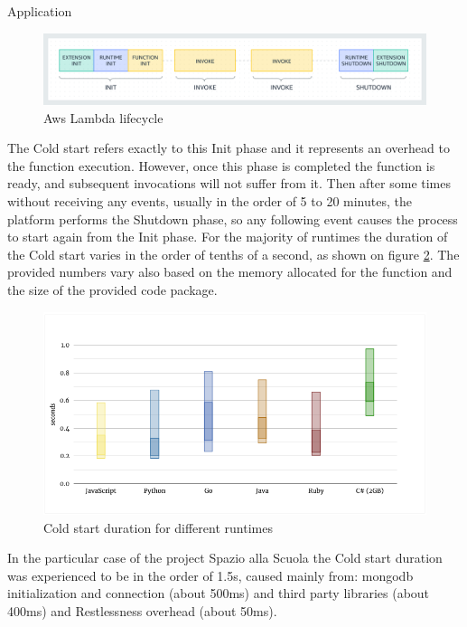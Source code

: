 \begin{chapter}{Application}
    \begin{figure}
        \centering
        \includegraphics[width=\linewidth]{source/images/aws-lambda-lifecycle.png}
        \caption{Aws Lambda lifecycle}
        \label{fig:aws_lambda_lifecycle}
    \end{figure}

    The Cold start refers exactly to this Init phase and it represents an overhead to the
    function execution. However, once this phase is completed the function is ready,
    and subsequent invocations will not suffer from it. Then after some times without
    receiving any events, usually in the order of 5 to 20 minutes, the platform performs
    the Shutdown phase, so any following event causes the process to start again from
    the Init phase.
    For the majority of runtimes the duration of the Cold start varies in the order
    of tenths of a second, as shown on figure \ref{fig:cold_start_duration}. The provided
    numbers vary also based on the memory allocated for the function and the size of the
    provided code package.

    \begin{figure}
        \centering
        \includegraphics[width=\linewidth]{source/images/cold-start-duration.png}
        \caption{Cold start duration for different runtimes}
        \label{fig:cold_start_duration}
    \end{figure}

    In the particular case of the project Spazio alla Scuola the Cold start duration
    was experienced to be in the order of 1.5s, caused mainly from: mongodb
    initialization and connection (about 500ms) and third party libraries (about 400ms)
    and Restlessness overhead (about 50ms).


\end{chapter}
